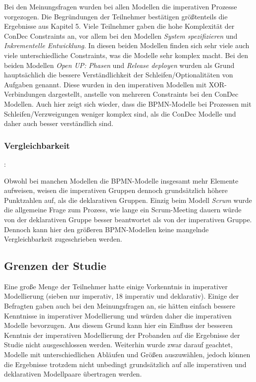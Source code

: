 Bei den Meinungsfragen wurden bei allen Modellen die imperativen Prozesse vorgezogen. Die Begründungen der Teilnehmer bestätigen größtenteils die Ergebnisse aus Kapitel 5. Viele Teilnehmer gaben die hohe Komplexität der ConDec Constraints an, vor allem bei den Modellen \textit{System spezifizieren} und \textit{Inkrementelle Entwicklung}. In diesen beiden Modellen finden sich sehr viele auch viele unterschiedliche Constraints, was die Modelle sehr komplex macht.\newline
Bei den beiden Modellen \textit{Open UP: Phasen} und \textit{Release deployen} wurden als Grund hauptsächlich die bessere Verständlichkeit der Schleifen/Optionalitäten von Aufgaben genannt. Diese wurden in den imperativen Modellen mit XOR-Verbindungen dargestellt, anstelle von mehreren Constraints bei den ConDec Modellen. Auch hier zeigt sich wieder, dass die BPMN-Modelle bei Prozessen mit Schleifen/Verzweigungen weniger komplex sind, als die ConDec Modelle und daher auch besser verständlich sind.\newline


\subsubsection{Vergleichbarkeit}: 

Obwohl bei manchen Modellen die BPMN-Modelle insgesamt mehr Elemente aufweisen, weisen die imperativen Gruppen dennoch grundsätzlich höhere Punktzahlen auf, als die deklarativen Gruppen. Einzig beim Modell \textit{Scrum} wurde die allgemeine Frage zum Prozess, wie lange ein Scrum-Meeting dauern würde von der deklarativen Gruppe besser beantwortet als von der imperativen Gruppe. Dennoch kann hier den größeren BPMN-Modellen keine mangelnde Vergleichbarkeit zugeschrieben werden.\newline



\subsection{Grenzen der Studie}

Eine große Menge der Teilnehmer hatte einige Vorkenntnis in imperativer Modellierung (sieben nur imperativ, 18 imperativ und deklarativ). Einige der Befragten gaben auch bei den Meinungsfragen an, sie hätten einfach bessere Kenntnisse in imperativer Modellierung und würden daher die imperativen Modelle bevorzugen. Aus diesem Grund kann hier ein Einfluss der besseren Kenntnis der imperativen Modellierung der Probanden auf die Ergebnisse der Studie nicht ausgeschlossen werden. \newline 
Weiterhin wurde zwar darauf geachtet, Modelle mit unterschiedlichen Abläufen und Größen auszuwählen, jedoch können die Ergebnisse trotzdem nicht unbedingt grundsätzlich auf alle imperativen und deklarativen Modellpaare übertragen werden. \newline

 










